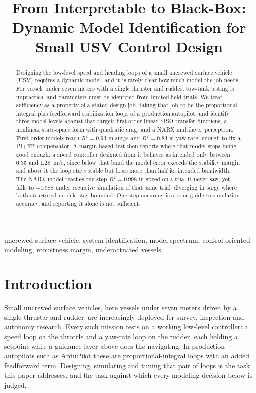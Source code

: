 \documentclass[conference]{IEEEtran}
\title{From Interpretable to Black-Box: Dynamic Model Identification
for Small USV Control Design}
\author{
  \IEEEauthorblockN{Brian S. Bingham and Carson Vogt}
  \IEEEauthorblockA{
    Department of Mechanical and Aerospace Engineering\\
    Naval Postgraduate School\\
    Monterey, CA, USA\\
    bbingham@nps.edu, crvogt@nps.edu
  }
}
\begin{document}
\maketitle

\begin{abstract}
Designing the low-level speed and heading loops of a small uncrewed surface vehicle (USV) requires a dynamic model, and it is rarely clear how much model the job needs. For vessels under seven meters with a single thruster and rudder, tow-tank testing is impractical and parameters must be identified from limited field trials. We treat sufficiency as a property of a stated design job, taking that job to be the proportional-integral plus feedforward stabilization loops of a production autopilot, and identify three model levels against that target: first-order linear SISO transfer functions, a nonlinear state-space form with quadratic drag, and a NARX multilayer perceptron. First-order models reach $R^2=0.93$ in surge and $R^2=0.83$ in yaw rate, enough to fix a PI+FF compensator. A margin-based test then reports where that model stops being good enough: a speed controller designed from it behaves as intended only between 0.35 and 1.28~m/s, since below that band the model error exceeds the stability margin and above it the loop stays stable but loses more than half its intended bandwidth. The NARX model reaches one-step $R^2=0.998$ in speed on a trial it never saw, yet falls to $-1.988$ under recursive simulation of that same trial, diverging in surge where both structured models stay bounded. One-step accuracy is a poor guide to simulation accuracy, and reporting it alone is not sufficient.
\end{abstract}

\begin{IEEEkeywords}
uncrewed surface vehicle, system identification, model spectrum, control-oriented modeling, robustness margin, underactuated vessels
\end{IEEEkeywords}

\section{Introduction}
\label{sec:intro}

Small uncrewed surface vehicles, here vessels under seven meters driven by a single thruster and rudder, are increasingly deployed for survey, inspection and autonomy research. Every such mission rests on a working low-level controller: a speed loop on the throttle and a yaw-rate loop on the rudder, each holding a setpoint while a guidance layer above does the navigating. In production autopilots such as ArduPilot these are proportional-integral loops with an added feedforward term. Designing, simulating and tuning that pair of loops is the task this paper addresses, and the task against which every modeling decision below is judged.
\end{document}
